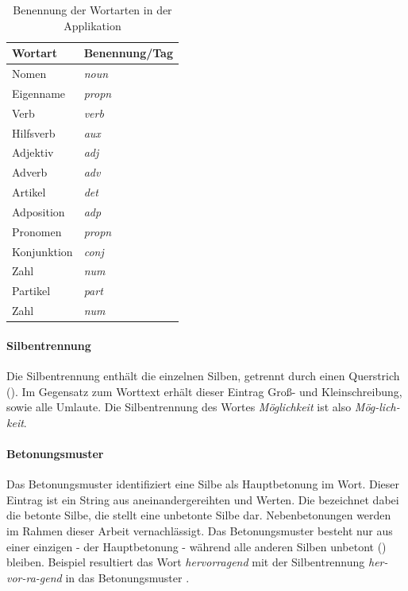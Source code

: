 \begin{table}[h!]
	\centering
	\begin{tabular}{|l|l|}
		\hline
		Wortart & Benennung/Tag \\
		\hline
		\hline
		Nomen & \textit{noun}\\
		Eigenname & \textit{propn}\\
		Verb & \textit{verb}\\
		Hilfsverb & \textit{aux}\\
		Adjektiv & \textit{adj}\\
		Adverb & \textit{adv}\\
		Artikel & \textit{det}\\
		Adposition & \textit{adp}\\
		Pronomen & \textit{propn}\\
		Konjunktion & \textit{conj}\\
		Zahl & \textit{num}\\
		Partikel & \textit{part}\\
		Zahl & \textit{num}\\
		\hline
	\end{tabular}
	\caption{Benennung der Wortarten in der Applikation}
\end{table}

\paragraph{Silbentrennung}
Die Silbentrennung enthält die einzelnen Silben, getrennt durch einen Querstrich (\qq{-}). Im Gegensatz zum Worttext erhält dieser Eintrag Groß- und Kleinschreibung, sowie alle Umlaute. Die Silbentrennung des Wortes \textit{Möglichkeit} ist also \textit{Mög-lich-keit}.

\paragraph{Betonungsmuster}
Das Betonungsmuster identifiziert eine Silbe als Hauptbetonung im Wort. Dieser Eintrag ist ein String aus aneinandergereihten  und  Werten. Die  bezeichnet dabei die betonte Silbe, die  stellt eine unbetonte Silbe dar. Nebenbetonungen werden im Rahmen dieser Arbeit vernachlässigt. Das Betonungsmuster besteht nur aus einer einzigen  - der Hauptbetonung - während alle anderen Silben unbetont () bleiben. Beispiel resultiert das Wort \textit{hervorragend} mit der Silbentrennung \textit{her-vor-ra-gend} in das Betonungsmuster .

